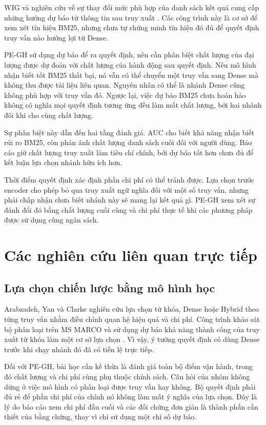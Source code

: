 WIG và nghiên cứu về sự thay đổi mức phù hợp của danh sách kết quả cung cấp những hướng dự báo từ thông tin sau truy xuất \cite{wig2007,querydrift2012}. Các công trình này là cơ sở để xem xét tín hiệu BM25, nhưng chưa tự chứng minh tín hiệu đó đủ để quyết định truy vấn nào hưởng lợi từ Dense.

PE-GH sử dụng dự báo để ra quyết định, nên cần phân biệt chất lượng của đại lượng được dự đoán với chất lượng của hành động sau quyết định. Nếu mô hình nhận biết tốt BM25 thất bại, nó vẫn có thể chuyển một truy vấn sang Dense mà không thu được tài liệu liên quan. Nguyên nhân có thể là nhánh Dense cũng không phù hợp với truy vấn đó. Ngược lại, việc dự báo BM25 chưa hoàn hảo không có nghĩa mọi quyết định tương ứng đều làm mất chất lượng, bởi hai nhánh đôi khi cho cùng chất lượng.

Sự phân biệt này dẫn đến hai tầng đánh giá. AUC cho biết khả năng nhận biết rủi ro BM25, còn \ndcg{} phản ánh chất lượng danh sách cuối đối với người dùng. Báo cáo giữ chất lượng truy xuất làm tiêu chí chính, bởi dự báo tốt hơn chưa đủ để kết luận lựa chọn nhánh hữu ích hơn.

Thời điểm quyết định xác định phần chi phí có thể tránh được. Lựa chọn trước encoder cho phép bỏ qua truy xuất ngữ nghĩa đối với một số truy vấn, nhưng phải chấp nhận chưa biết nhánh này sẽ mang lại kết quả gì. PE-GH xem xét sự đánh đổi đó bằng chất lượng cuối cùng và chi phí thực tế khi các phương pháp được sử dụng cùng ngân sách.

\section{Các nghiên cứu liên quan trực tiếp}
\subsection{Lựa chọn chiến lược bằng mô hình học}
Arabzadeh, Yan và Clarke nghiên cứu lựa chọn từ khóa, Dense hoặc Hybrid theo từng truy vấn nhằm điều chỉnh quan hệ hiệu quả và chi phí. Công trình khảo sát bộ phân loại trên MS MARCO và sử dụng dự báo khả năng thành công của truy xuất từ khóa làm một cơ sở lựa chọn \cite{arabzadeh2021}. Vì vậy, ý tưởng quyết định có dùng Dense trước khi chạy nhánh đó đã có tiền lệ trực tiếp.

Đối với PE-GH, bài học cần kế thừa là đánh giá toàn bộ điểm vận hành, trong đó chất lượng và chi phí cùng phụ thuộc chính sách. Câu hỏi của nhóm không dừng ở việc mô hình có phân loại được truy vấn hay không. Bộ quyết định phải đủ rẻ để phần chi phí của chính nó không làm mất ý nghĩa của lựa chọn. Đây là lý do báo cáo xem chi phí đầu cuối và các đối chứng đơn giản là thành phần cần thiết của bằng chứng, thay vì chỉ sử dụng một chỉ số dự báo.

